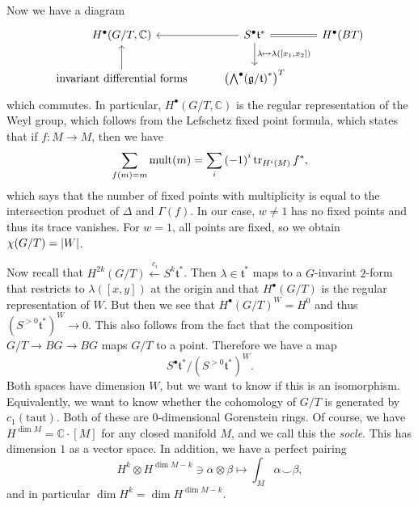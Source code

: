 \documentclass[leqno, openany]{memoir}
\theoremstyle{definition}
\theoremstyle{remark}
\theoremstyle{plain}
\theoremstyle{definition}
\theoremstyle{remark}
\newcommand{\C}{\mathbb{C}}
\newcommand{\mf}[1]{\mathfrak{#1}}
\begin{document}
Now we have a diagram \begin{equation*} \begin{tikzcd} H^{\bullet}(G/T, \C) &
    S^{\bullet} \mf{t}^* \ar[equal]{r} \ar{l} \ar{d}{\lambda \mapsto
    \lambda([x_1, x_2])} & H^{\bullet}(BT) \\ \text{invariant differential
forms} \ar{u} & {\qty({\bigwedge}^{\bullet}{(\mf{g}/\mf{t})}^*)}^T \end{tikzcd}
\end{equation*} which commutes. In particular, $H^{\bullet}(G/T, \C)$ is the
regular representation of the Weyl group, which follows from the Lefschetz
fixed point formula, which states that if $f \colon M \to M$, then we have \[
\sum_{f(m) = m} \operatorname{mult}(m) = \sum_i {(-1)}^i \tr_{H^i(M)} f^*, \]
which says that the number of fixed points with multiplicity is equal to the
intersection product of $\Delta$ and $\Gamma(f)$. In our case, $w \neq 1$ has
no fixed points and thus its trace vanishes. For $w = 1$, all points are fixed,
so we obtain $\chi(G/T) = \abs{W}$.

Now recall that $H^{2k}(G/T) \xleftarrow{c_i} S^k \mf{t}^*$. Then $\lambda \in
\mf{t}^*$ maps to a $G$-invarint $2$-form that restricts to $\lambda([x,y])$ at
the origin and that $H^{\bullet}(G/T)$ is the regular representation of $W$.
But then we see that ${H^{\bullet}(G/T)}^W = H^0$ and thus ${(S^{>0}
\mf{t}^*)}^W \to 0$. This also follows from the fact that the composition $G/T
\to BG \to BG$ maps $G/T$ to a point. Therefore we have a map \[ S^{\bullet}
\mf{t}^* / {(S^{>0} \mf{t}^*)}^W. \] Both spaces have dimension $W$, but we
want to know if this is an isomorphism. Equivalently, we want to know whether
the cohomology of $G/T$ is generated by $c_1(\text{taut})$. Both of these are
$0$-dimensional Gorenstein rings. Of course, we have $H^{\dim M} = \C \cdot
[M]$ for any closed manifold $M$, and we call this the \textit{socle}. This has
dimension $1$ as a vector space. In addition, we have a perfect pairing \[ H^k
\otimes H^{\dim M - k} \ni \alpha \otimes \beta \mapsto \int_M \alpha \smile
\beta, \] and in particular $\dim H^k = \dim H^{\dim M - k}$. 
\end{document}
